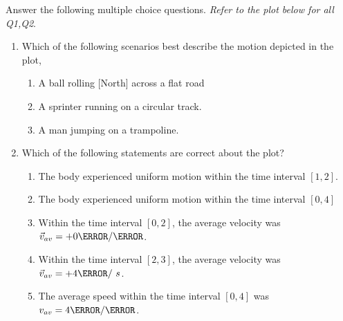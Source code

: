 \documentclass[12pt]{article} %
\newcommand{\tx}[1]{\text{#1}}
\begin{document}
\begin{qstn}[2]
Answer the following multiple choice questions. \emph{Refer to the plot below for all Q1,Q2}.
		\begin{center}
		\end{center}
	\begin{enumerate}
		\item Which of the following scenarios best describe the motion depicted in the plot,

			\begin{enumerate}[label = (\alph*)]
				\item A ball rolling [North] across a flat road
				\item A sprinter running on a circular track.
				\item A man jumping on a trampoline.
			\end{enumerate}


		\item Which of the following statements are correct about the plot?
			\begin{enumerate}[label = (\alph*)]
				\item The body experienced uniform motion within the time interval $[1,2]$.
				\item The body experienced uniform motion within the time interval $[0,4]$
				\item Within the time interval $[0,2]$, the average velocity was $\vec v_{av} = +0 \m / \s$.
				\item Within the time interval $[2,3]$, the average velocity was $\vec v_{av} = +4 \m / \ s$.
				\item The average speed within the time interval $[0,4]$ was $v_{av} = 4 \m / \s$.
			\end{enumerate}


\end{enumerate}
\end{qstn}
\end{document}
